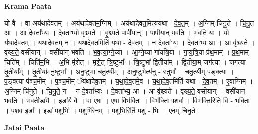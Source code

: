 \documentclass[17pt]{extarticle}
\begin{document}
\textbf{Krama Paata} \newline

यो वै । वा अय॑थादेवतम् । अय॑थादेवतम॒ग्निम् । अय॑थादेवत॒मित्यय॑था - दे॒व॒त॒म् । अ॒ग्निम् चि॑नु॒ते । चि॒नु॒त आ । आ दे॒वता᳚भ्यः । दे॒वता᳚भ्यो वृश्च्यते । वृ॒श्च्य॒ते॒ पापी॑यान् । पापी॑यान् भवति । भ॒व॒ति॒ यः । यो य॑थादेव॒तम् । य॒था॒दे॒व॒तम् न । य॒था॒दे॒व॒तमिति॑ यथा - दे॒व॒तम् । न दे॒वता᳚भ्यः । दे॒वता᳚भ्य॒ आ । आ वृ॑श्च्यते । वृ॒श्च्य॒ते॒ वसी॑यान् । वसी॑यान् भवति । भ॒व॒त्या॒ग्ने॒य्या । आ॒ग्ने॒य्या गा॑यत्रि॒या । गा॒य॒त्रि॒या प्र॑थ॒माम् । प्र॒थ॒माम् चिति᳚म् । चिति॑म॒भि । अ॒भि मृ॑शेत् । मृ॒शे॒त् त्रि॒ष्टुभा᳚ । त्रि॒ष्टुभा᳚ द्वि॒तीया᳚म् । द्वि॒तीया॒म् जग॑त्या । जग॑त्या तृ॒तीया᳚म् । तृ॒तीया॑मनु॒ष्टुभा᳚ । अ॒नु॒ष्टुभा॑ चतु॒र्त्थीम् । अ॒नु॒ष्टुभेत्य॑नु - स्तुभा᳚ । च॒तु॒र्त्थीम् प॒ङ्क्त्या । प॒ङ्क्त्या प॑ञ्च॒मीम् । प॒ञ्च॒मीम् ॅय॑थादेव॒तम् । य॒था॒दे॒व॒तमे॒व । य॒था॒दे॒व॒तमिति॑ यथा - दे॒व॒तम् । ए॒वाग्निम् । अ॒ग्निम् चि॑नुते । चि॒नु॒ते॒ न । न दे॒वता᳚भ्यः । दे॒वता᳚भ्य॒ आ । आ वृ॑श्च्यते । वृ॒श्च्य॒ते॒ वसी॑यान् । वसी॑यान् भवति । भ॒व॒तीडा॑यै । इडा॑यै॒ वै । वा ए॒षा । ए॒षा विभ॑क्तिः । विभ॑क्तिः प॒शवः॑ । विभ॑क्ति॒रिति॒ वि - भ॒क्तिः॒ । प॒शव॒ इडा᳚ । इडा॑ प॒शुभिः॑ । प॒शुभि॑रेनम् । प॒शुभि॒रिति॑ प॒शु - भिः॒ । ए॒न॒म् चि॒नु॒ते॒ \newline

\textbf{Jatai Paata} \newline
\end{document}
